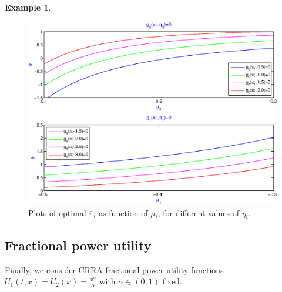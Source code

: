 \documentclass[11pt]{article}
\theoremstyle{plain}
\theoremstyle{definition}
\newtheorem{example}[theorem]{Example}
\numberwithin{equation}{section}
\begin{document}
\begin{example}
\begin{figure}[hb]
\centering
\includegraphics[scale=0.75]{Figure23.eps}
\caption{\small Plots of optimal $\bar{\pi}_i$ as function of $\mu_i$, for different values of $\eta_i$.}
\end{figure}

\end{example}

\subsection{Fractional power utility}

Finally, we consider CRRA fractional power utility functions $U_1(t,x)=U_2(x)=\frac{x^\alpha}{\alpha}$ with $\alpha\in(0,1)$ fixed.

\end{document}
